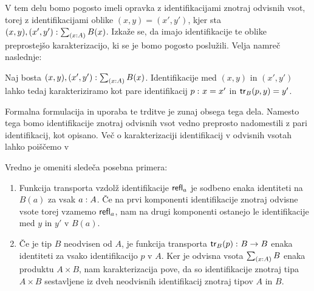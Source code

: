 V tem delu bomo pogosto imeli opravka z identifikacijami znotraj odvisnih vsot, torej z identifikacijami oblike \((x, y) = (x', y')\), kjer sta
\((x, y), (x', y') : \textstyle \sum_{\left( x : A \right)} B(x)\). Izkaže se, da imajo identifikacije te oblike preprostejšo karakterizacijo, ki se je bomo pogosto poslužili.
Velja namreč naslednje:
\begin{trditev}
  Naj bosta \((x, y), (x', y') : \textstyle \sum_{\left( x : A \right)} B(x)\). Identifikacije med \((x, y)\) in \((x', y')\) lahko tedaj karakteriziramo kot pare identifikacij
  \(p \,\colon x = x'\) in \(\textnormal{\textsf{tr}}_{B}(p, y) = y'\).
\end{trditev}
Formalna formulacija in uporaba te trditve je zunaj obsega tega dela. Namesto tega bomo identifikacije znotraj odvisnih vsot vedno preprosto nadomestili z pari identifikacij, kot opisano. Več o karakterizaciji identifikacij v odvisnih vsotah lahko poiščemo v \cite[Poglavje II.9.3]{rijke2022introduction}

Vredno je omeniti sledeča posebna primera:
\begin{enumerate}
\item Funkcija transporta vzdolž identifikacije \(\textnormal{\textsf{refl}}_{a}\) je sodbeno enaka identiteti na \(B(a)\) za vsak \(a : A\). Če na prvi komponenti identifikacije znotraj odvisne vsote torej vzamemo \(\textnormal{\textsf{refl}}_{a}\), nam na drugi komponenti ostanejo le identifikacije med \(y\) in \(y'\) v \(B(a)\).
\item Če je tip \(B\) neodvisen od \(A\), je funkcija transporta
  \(\textnormal{\textsf{tr}}_{B}(p) \,\colon B \to B\) enaka identiteti za vsako identifikacijo \(p\) v \(A\).
  Ker je odvisna vsota \(\textstyle \sum_{\left( x : A \right)} B\) enaka produktu \(A \times B\), nam karakterizacija pove, da so identifikacije znotraj tipa \(A \times B\) sestavljene iz dveh neodvisnih identifikacij znotraj tipov \(A\) in \(B\).
\end{enumerate}
